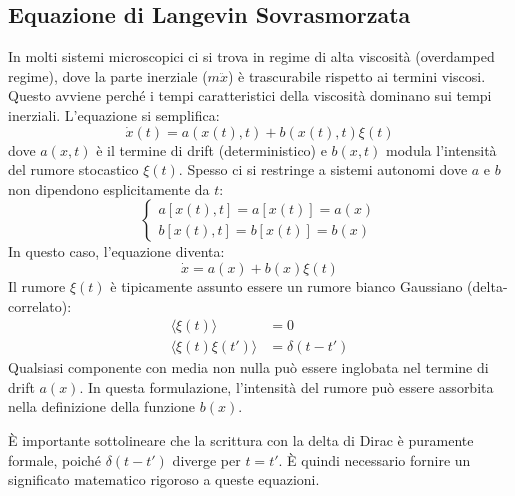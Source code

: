 \subsection{Equazione di Langevin Sovrasmorzata}
In molti sistemi microscopici ci si trova in regime di alta viscosità (overdamped regime), dove la parte inerziale ($m \ddot{x}$) è trascurabile rispetto ai termini viscosi. Questo avviene perché i tempi caratteristici della viscosità dominano sui tempi inerziali. L'equazione si semplifica:
\begin{equation}
\dot{x}(t) = a(x(t), t) + b(x(t), t) \xi(t)
\end{equation}
dove $a(x,t)$ è il termine di drift (deterministico) e $b(x,t)$ modula l'intensità del rumore stocastico $\xi(t)$. Spesso ci si restringe a sistemi autonomi dove $a$ e $b$ non dipendono esplicitamente da $t$:
\begin{equation}
\begin{cases}
a[x(t),t] = a[x(t)] = a(x) \\
b[x(t),t] = b[x(t)] = b(x)
\end{cases}
\end{equation}
In questo caso, l'equazione diventa:
\begin{equation}
\dot{x} = a(x) + b(x) \xi(t)
\end{equation}
Il rumore $\xi(t)$ è tipicamente assunto essere un rumore bianco Gaussiano (delta-correlato):
\begin{equation}
\begin{aligned}
\langle \xi(t) \rangle &= 0 \\
\langle \xi(t) \xi(t') \rangle &= \delta(t-t')
\end{aligned}
\end{equation}
Qualsiasi componente con media non nulla può essere inglobata nel termine di drift $a(x)$. In questa formulazione, l'intensità del rumore può essere assorbita nella definizione della funzione $b(x)$.

\begin{tcolorbox}[colback=colorA!5,colframe=colorA, title=Nota]
È importante sottolineare che la scrittura con la delta di Dirac è puramente formale, poiché $\delta(t-t')$ diverge per $t=t'$. È quindi necessario fornire un significato matematico rigoroso a queste equazioni.
\end{tcolorbox}

